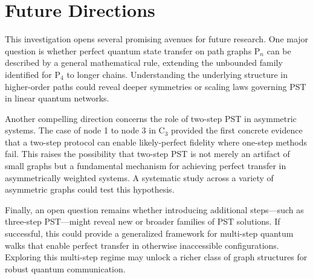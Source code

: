 \documentclass[reprint, aps, 12pt, floatfix]{revtex4-2}
\begin{document}
\section{Future Directions}
This investigation opens several promising avenues for future research. One major question is whether perfect quantum state transfer on path graphs P$_n$ can be described by a general mathematical rule, extending the unbounded family identified for P$_4$ to longer chains. Understanding the underlying structure in higher-order paths could reveal deeper symmetries or scaling laws governing PST in linear quantum networks.

Another compelling direction concerns the role of two-step PST in asymmetric systems. The case of node 1 to node 3 in C$_3$ provided the first concrete evidence that a two-step protocol can enable likely-perfect fidelity where one-step methods fail. This raises the possibility that two-step PST is not merely an artifact of small graphs but a fundamental mechanism for achieving perfect transfer in asymmetrically weighted systems. A systematic study across a variety of asymmetric graphs could test this hypothesis.

Finally, an open question remains whether introducing additional steps—such as three-step PST—might reveal new or broader families of PST solutions. If successful, this could provide a generalized framework for multi-step quantum walks that enable perfect transfer in otherwise inaccessible configurations. Exploring this multi-step regime may unlock a richer class of graph structures for robust quantum communication.

\FloatBarrier
\onecolumngrid
\clearpage
\appendix
\end{document}
